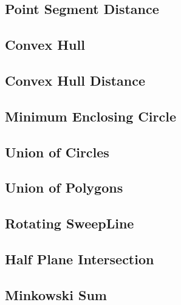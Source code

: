 \subsection{Point Segment Distance}

\subsection{Convex Hull}

\subsection{Convex Hull Distance}

\subsection{Minimum Enclosing Circle}

\subsection{Union of Circles}
\subsection{Union of Polygons}
% 
% 
\subsection{Rotating SweepLine}

\subsection{Half Plane Intersection}
\subsection{Minkowski Sum}
